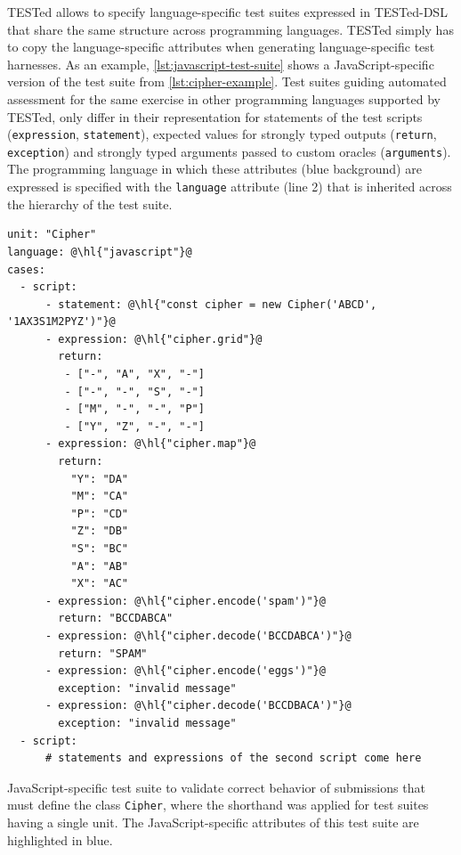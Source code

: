\documentclass[../main]{subfiles}
\begin{document}
TESTed allows to specify language-specific test suites expressed in TESTed-DSL that share the same structure across programming languages.
TESTed simply has to copy the language-specific attributes when generating language-specific test harnesses.
As an example, \vref{lst:javascript-test-suite} shows a JavaScript-specific version of the test suite from \vref{lst:cipher-example}.
Test suites guiding automated assessment for the same exercise in other programming languages supported by TESTed, only differ in their representation for statements of the test scripts (\texttt{expression}, \texttt{statement}), expected values for strongly typed outputs (\texttt{return}, \texttt{exception}) and strongly typed arguments passed to custom oracles (\texttt{arguments}).
The programming language in which these attributes (blue background) are expressed is specified with the \texttt{language} attribute (line 2) that is inherited across the hierarchy of the test suite.

\begin{listing}
    \begin{verbatim}
unit: "Cipher"
language: @\hl{"javascript"}@
cases:
  - script:
      - statement: @\hl{"const cipher = new Cipher('ABCD', '1AX3S1M2PYZ')"}@
      - expression: @\hl{"cipher.grid"}@
        return:
         - ["-", "A", "X", "-"]
         - ["-", "-", "S", "-"]
         - ["M", "-", "-", "P"]
         - ["Y", "Z", "-", "-"]
      - expression: @\hl{"cipher.map"}@
        return:
          "Y": "DA"
          "M": "CA"
          "P": "CD"
          "Z": "DB"
          "S": "BC"
          "A": "AB"
          "X": "AC"
      - expression: @\hl{"cipher.encode('spam')"}@
        return: "BCCDABCA"
      - expression: @\hl{"cipher.decode('BCCDABCA')"}@
        return: "SPAM"
      - expression: @\hl{"cipher.encode('eggs')"}@
        exception: "invalid message"
      - expression: @\hl{"cipher.decode('BCCDBACA')"}@
        exception: "invalid message"
  - script:
      # statements and expressions of the second script come here
    \end{verbatim}
    \caption[]{
        JavaScript-specific test suite to validate correct behavior of submissions that must define the class \texttt{Cipher}, where the shorthand was applied for test suites having a single unit.
        The JavaScript-specific attributes of this test suite are highlighted in blue.
    }
    \label{lst:javascript-test-suite}
\end{listing}
\end{document}
